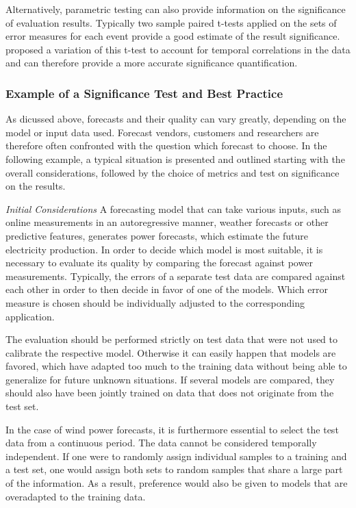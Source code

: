 Alternatively, parametric testing can also provide information on the significance of evaluation results. 
Typically two sample paired t-tests applied on the sets of error measures for each event provide a good estimate of the result significance. 
\citet{Diebold1995} proposed a variation of this t-test to account for temporal correlations in the data and can therefore provide a more accurate significance quantification.
 
 
\subsubsection{Example of a Significance Test and Best Practice} \label{sec:significanceTestExample}  %


As dicussed above, forecasts and their quality can vary greatly, depending on the model or input data used. Forecast vendors, customers and researchers are therefore often confronted with the question which forecast to choose. 
In the following example, a typical situation is presented and outlined starting with the overall considerations, followed by the choice of metrics and test on significance on the results. 

\emph{Initial Considerations}
A forecasting model that can take various inputs, such as online measurements in an autoregressive manner, weather forecasts or other predictive features, generates power forecasts, which estimate the future electricity production. In order to decide which model is most suitable, it is necessary to evaluate its quality by comparing the forecast against power measurements. Typically, the errors of a separate test data are compared against each other in order to then decide in favor of one of the models. Which error measure is chosen should be individually adjusted to the corresponding application.

The evaluation should be performed strictly on test data that were not used to calibrate the respective model.  Otherwise it can easily happen that models are favored, which have adapted too much to the training data without being able to generalize for future unknown situations. If several models are compared, they should also have been jointly trained on data that does not originate from the test set. 

In the case of wind power forecasts, it is furthermore essential to select the test data from a continuous period. The data cannot be considered temporally independent. If one were to randomly assign individual samples to a training and a test set, one would assign both sets to random samples that share a large part of the information. As a result, preference would also be given to models that are overadapted to the training data.

